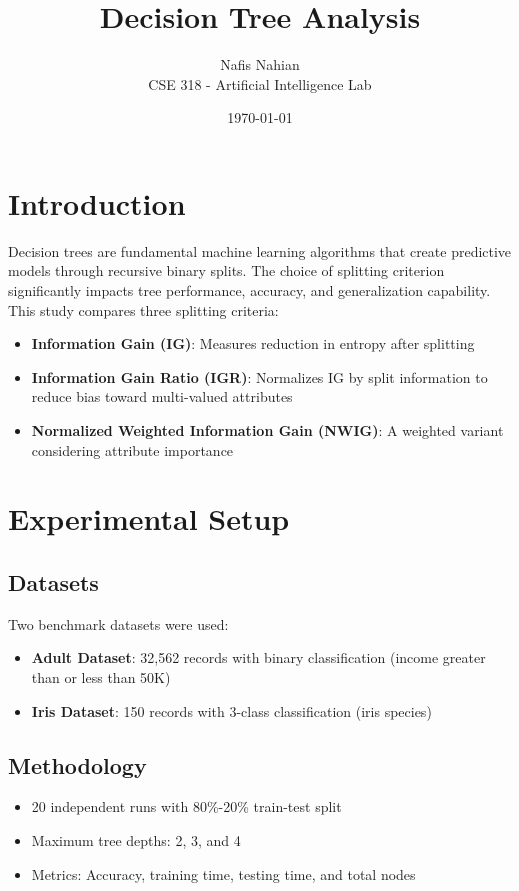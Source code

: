 \documentclass{article}
\title{\textbf{Decision Tree Analysis}}
\author{Nafis Nahian \\ CSE 318 - Artificial Intelligence Lab}
\date{\today}
\begin{document}
\maketitle

\section{Introduction}

Decision trees are fundamental machine learning algorithms that create predictive models through recursive binary splits. The choice of splitting criterion significantly impacts tree performance, accuracy, and generalization capability. This study compares three splitting criteria:

\begin{itemize}
    \item \textbf{Information Gain (IG)}: Measures reduction in entropy after splitting
    \item \textbf{Information Gain Ratio (IGR)}: Normalizes IG by split information to reduce bias toward multi-valued attributes
    \item \textbf{Normalized Weighted Information Gain (NWIG)}: A weighted variant considering attribute importance
\end{itemize}

\section{Experimental Setup}

\subsection{Datasets}
Two benchmark datasets were used:
\begin{itemize}
    \item \textbf{Adult Dataset}: 32,562 records with binary classification (income greater than or less than 50K)
    \item \textbf{Iris Dataset}: 150 records with 3-class classification (iris species)
\end{itemize}

\subsection{Methodology}
\begin{itemize}
    \item 20 independent runs with 80\%-20\% train-test split
    \item Maximum tree depths: 2, 3, and 4
    \item Metrics: Accuracy, training time, testing time, and total nodes
\end{itemize}
\end{document}
